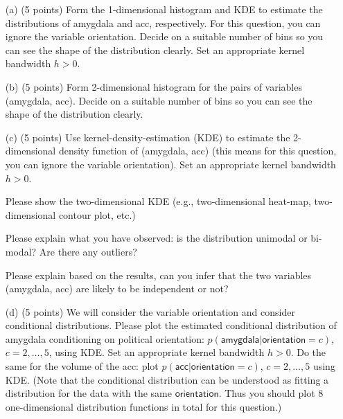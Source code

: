 \documentclass[twoside,10pt]{article}
\begin{document}
 \begin{enumerate}
 
 
 \item[(a)] (5 points) Form the 1-dimensional histogram and KDE to estimate the distributions of \textsf{amygdala} and \textsf{acc}, respectively. For this question, you can ignore the variable \textsf{orientation}. Decide on a suitable number of bins so you can see the shape of the distribution clearly. Set an appropriate kernel bandwidth $h >0$. 
 
 
 
 \item[(b)] (5 points) Form 2-dimensional histogram for the pairs of variables (\textsf{amygdala}, \textsf{acc}). Decide on a suitable number of bins so you can see the shape of the distribution clearly. 
 
 \item[(c)] (5 points) Use kernel-density-estimation (KDE) to estimate the 2-dimensional density function of (\textsf{amygdala}, \textsf{acc}) (this means for this question, you can ignore the variable \textsf{orientation}). Set an appropriate kernel bandwidth $h >0$. 

Please show the two-dimensional KDE (e.g., two-dimensional heat-map, two-dimensional contour plot, etc.)

Please explain what you have observed: is the distribution unimodal or bi-modal? Are there any outliers?

Please explain based on the results, can you infer that the two variables (\textsf{amygdala}, \textsf{acc}) are likely to be independent or not?


 \item[(d)] (5 points) We will consider the variable \textsf{orientation} and consider conditional distributions. Please plot the estimated conditional distribution of \textsf{amygdala} conditioning on political \textsf{orientation}: $p(\textsf{amygdala}|\textsf{orientation}=c)$, $c = 2, \ldots, 5$, using KDE. Set an appropriate kernel bandwidth $h >0$.  Do the same for the volume of the \textsf{acc}: plot $p(\textsf{acc}|\textsf{orientation}=c)$, $c = 2, \ldots, 5$ using KDE. (Note that the conditional distribution can be understood as fitting a distribution for the data with the same $\textsf{orientation}$. Thus you should plot 8 one-dimensional distribution functions in total for this question.) 
 

\end{enumerate}
\end{document}
